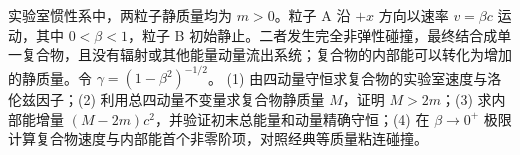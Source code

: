 实验室惯性系中，两粒子静质量均为 \(m>0\)。粒子 A 沿 \(+x\) 方向以速率 \(v=\beta c\) 运动，其中 \(0<\beta<1\)，粒子 B 初始静止。二者发生完全非弹性碰撞，最终结合成单一复合物，且没有辐射或其他能量动量流出系统；复合物的内部能可以转化为增加的静质量。令 \(\gamma=(1-\beta^2)^{-1/2}\)。
(1) 由四动量守恒求复合物的实验室速度与洛伦兹因子；(2) 利用总四动量不变量求复合物静质量 \(M\)，证明 \(M>2m\)；(3) 求内部能增量 \((M-2m)c^2\)，并验证初末总能量和动量精确守恒；(4) 在 \(\beta\to0^+\) 极限计算复合物速度与内部能首个非零阶项，对照经典等质量粘连碰撞。
